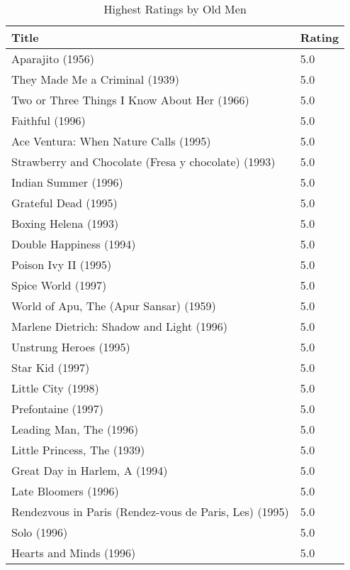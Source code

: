 \begin{table}[h!]
\centering
\begin{tabular}{| l | l |}
\hline
Title & Rating \\
\hline
Aparajito (1956) & 5.0 \\
They Made Me a Criminal (1939) & 5.0 \\
Two or Three Things I Know About Her (1966) & 5.0 \\
Faithful (1996) & 5.0 \\
Ace Ventura: When Nature Calls (1995) & 5.0 \\
Strawberry and Chocolate (Fresa y chocolate) (1993) & 5.0 \\
Indian Summer (1996) & 5.0 \\
Grateful Dead (1995) & 5.0 \\
Boxing Helena (1993) & 5.0 \\
Double Happiness (1994) & 5.0 \\
Poison Ivy II (1995) & 5.0 \\
Spice World (1997) & 5.0 \\
World of Apu, The (Apur Sansar) (1959) & 5.0 \\
Marlene Dietrich: Shadow and Light (1996)  & 5.0 \\
Unstrung Heroes (1995) & 5.0 \\
Star Kid (1997) & 5.0 \\
Little City (1998) & 5.0 \\
Prefontaine (1997) & 5.0 \\
Leading Man, The (1996) & 5.0 \\
Little Princess, The (1939) & 5.0 \\
Great Day in Harlem, A (1994) & 5.0 \\
Late Bloomers (1996) & 5.0 \\
Rendezvous in Paris (Rendez-vous de Paris, Les) (1995) & 5.0 \\
Solo (1996) & 5.0 \\
Hearts and Minds (1996) & 5.0 \\
\hline
\end{tabular}
\caption{Highest Ratings by Old Men}
\label{tab:hrbom}
\end{table}

